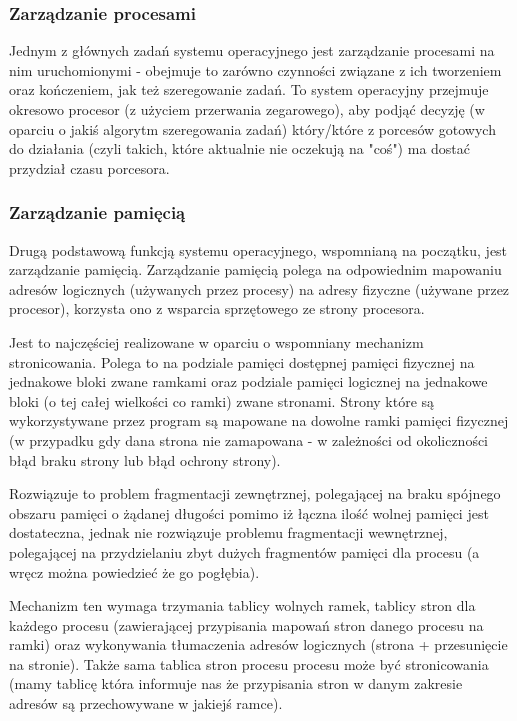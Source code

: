 \subsubsection{Zarządzanie procesami}

Jednym z głównych zadań systemu operacyjnego jest zarządzanie procesami na nim uruchomionymi - obejmuje to zarówno czynności związane z ich tworzeniem oraz kończeniem, jak też szeregowanie zadań. To system operacyjny przejmuje okresowo procesor (z użyciem przerwania zegarowego), aby podjąć decyzję (w oparciu o jakiś algorytm szeregowania zadań) który/które z porcesów gotowych do działania (czyli takich, które aktualnie nie oczekują na "coś") ma dostać przydział czasu porcesora.

\subsubsection{Zarządzanie pamięcią}

Drugą podstawową funkcją systemu operacyjnego, wspomnianą na początku, jest zarządzanie pamięcią. Zarządzanie pamięcią polega na odpowiednim mapowaniu adresów logicznych (używanych przez procesy) na adresy fizyczne (używane przez procesor), korzysta ono z wsparcia sprzętowego ze strony procesora.

Jest to najczęściej realizowane w oparciu o wspomniany mechanizm stronicowania. Polega to na podziale pamięci dostępnej pamięci fizycznej na jednakowe bloki zwane ramkami oraz podziale pamięci logicznej na jednakowe bloki (o tej całej wielkości co ramki) zwane stronami. Strony które są wykorzystywane przez program są mapowane na dowolne ramki pamięci fizycznej (w przypadku gdy dana strona nie zamapowana - w zależności od okoliczności błąd braku strony lub błąd ochrony strony).

Rozwiązuje to problem fragmentacji zewnętrznej, polegającej na braku spójnego obszaru pamięci o żądanej długości pomimo iż łączna ilość wolnej pamięci jest dostateczna, jednak nie rozwiązuje problemu fragmentacji wewnętrznej, polegającej na przydzielaniu zbyt dużych fragmentów pamięci dla procesu (a wręcz można powiedzieć że go pogłębia).

Mechanizm ten wymaga trzymania tablicy wolnych ramek, tablicy stron dla każdego procesu (zawierającej przypisania mapowań stron danego procesu na ramki) oraz wykonywania tłumaczenia adresów logicznych (strona + przesunięcie na stronie). Także sama tablica stron procesu procesu może być stronicowania (mamy tablicę która informuje nas że przypisania stron w danym zakresie adresów są przechowywane w jakiejś ramce).

